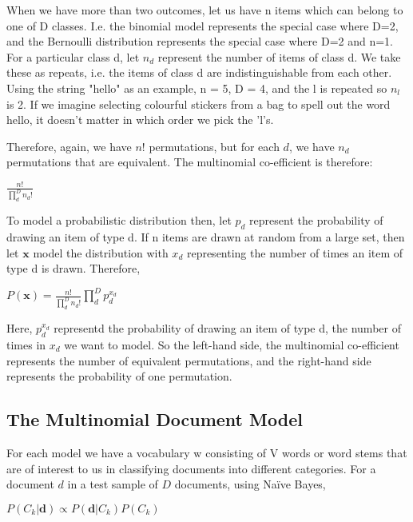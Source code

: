 \documentclass[10pt,a4paper]{article}
\begin{document}
		When we have more than two outcomes, let us have n items which can belong to one of D classes. I.e. the binomial model represents the special case where D=2, and the Bernoulli distribution represents the special case where D=2 and n=1. For a particular class d, let $n_d$ represent the number of items of class d. We take these as repeats, i.e. the items of class d are indistinguishable from each other. Using the string "hello" as an example, n = 5, D = 4, and the l is repeated so $n_l$ is 2. If we imagine selecting colourful stickers from a bag to spell out the word hello, it doesn't matter in which order we pick the 'l's.
		
		Therefore, again, we have $n!$ permutations, but for each $d$, we have $n_d$ permutations that are equivalent. The multinomial co-efficient is therefore:
		
		\begin{center}
			$ \frac{n!}{\prod\limits_d^D n_d!} $
		\end{center}
		
		To model a probabilistic distribution then,  let $p_d$ represent the probability of drawing an item of type d. If n items are drawn at random from a large set, then let $\bm x$ model the distribution with $x_d$ representing the number of times an item of type d is drawn. Therefore,
		
		\begin{center}
			$ P(\bm x) = \frac{n!}{\prod\limits_d^D n_d!} \prod\limits_d^D p_d^{x_d} $
		\end{center}
		
		Here, $p_d^{x_d}$ representd the probability of drawing an item of type d, the number of times in $x_d$ we want to model. So the left-hand side, the multinomial co-efficient represents the number of equivalent permutations, and the right-hand side represents the probability of one permutation. 
		
		\subsection{The Multinomial Document Model}
		
		
		For each model we have a vocabulary w consisting of V words or word stems that are of interest to us in classifying documents into different categories. For a document $d$ in a test sample of $D$ documents, using Naïve Bayes,
		
		\begin{center}
			$ P(C_k|\bm d) \propto P(\bm d|C_k)P(C_k) $
		\end{center}
		
\end{document}
